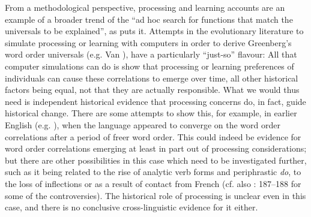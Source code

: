 \documentclass[output=paper]{langsci/langscibook}
\begin{document}
From a methodological perspective, processing and learning accounts are an example of a broader trend of the “ad hoc search for functions that match the universals to be explained”, as \citet[13]{Kirby1999} puts it. Attempts in the evolutionary literature to simulate processing or learning with computers in order to derive Greenberg’s word order universals (e.g. Van \citealt{Everbroeck1999,KirbyChristiansen2003}), have a particularly “just-so” flavour: All that computer simulations can do is show that processing or learning preferences of individuals can cause these correlations to emerge over time, all other historical factors being equal, not that they are actually responsible. What we would thus need is independent historical evidence that processing concerns do, in fact, guide historical change. There are some attempts to show this, for example, in earlier English (e.g. \citealt{Fischer1992,ClarkEtAl2008}), when the language appeared to converge on the word order correlations after a period of freer word order. This could indeed be evidence for word order correlations emerging at least in part out of processing considerations; but there are other possibilities in this case which need to be investigated further, such as it being related to the rise of analytic verb forms and periphrastic \textit{do}, to the loss of inflections or as a result of contact from French (cf. also  \citealt{FischervanderWurff2006}: 187–188 for some of the controversies). The historical role of processing is unclear even in this case, and there is no conclusive cross-linguistic evidence for it either.
\end{document}
